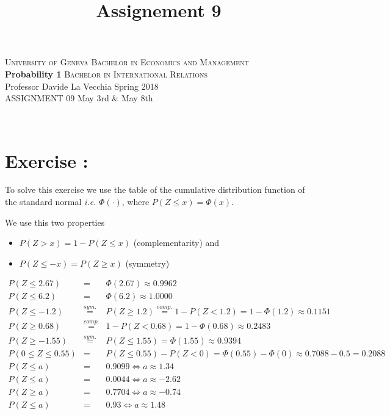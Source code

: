 \documentclass[12pt,thmsa]{article}
\title{Assignement 9}
\begin{document}
\noindent \textsc{University of Geneva}     \hfill \textsc{Bachelor in Economics and Management} \\
\textbf{Probability 1}                      \hfill \textsc{Bachelor in International Relations} \\
Professor Davide La Vecchia                 \hfill Spring 2018  \\
ASSIGNMENT 09                               \hfill  May 3rd \& May 8th



\noindent
\makebox[\linewidth]{\rule{\textwidth}{0.4pt}}\\[1.5ex]


\addtocounter{section}{1}
\section*{Exercise \thesection:}

To solve this exercise we use the table of the cumulative distribution function of the standard normal
{\it i.e.}  $\Phi(\cdot)$, where $P(Z\leq x)=\Phi(x)$.

We use this two properties
\begin{itemize}
\item $P(Z>x)=1-P(Z \leq x)$ (complementarity) and
\item $P(Z\leq-x) = P(Z\geq x)$ (symmetry)
\end{itemize}

\begin{eqnarray*}
P(Z \leq 2.67) &= &\Phi(2.67)  \approx  {0.9962} \\
P(Z\leq 6.2) &=& \Phi(6.2)  \approx  {1.0000}\\
P(Z\leq -1.2) &\stackrel{sym.}{=}& P(Z\geq 1.2) \stackrel{comp.}{=}
1-P(Z < 1.2) = 1-\Phi(1.2) \approx  {0.1151}\\
P(Z\geq 0.68) &\stackrel{comp.}{=}& 1-P(Z < 0.68) = 1-\Phi(0.68)
\approx  {0.2483}\\
P(Z\geq -1.55) &\stackrel{sym.}{=}& P(Z\leq 1.55) = \Phi(1.55) \approx   {0.9394}\\
P(0 \leq Z\leq 0.55) &=& P(Z \leq 0.55) - P(Z < 0) = \Phi(0.55) -
\Phi(0) \approx 0.7088-0.5= {0.2088}\\
P(Z\leq a) & = & 0.9099  \iff  a\approx {1.34}\\
P(Z\leq a) & = & 0.0044  \iff  a\approx {-2.62}\\
P(Z\geq a) & = & 0.7704  \iff  a\approx {-0.74}\\
P(Z\leq a) & = & 0.93  \iff  a\approx {1.48}\\
\end{eqnarray*}
\end{document}
